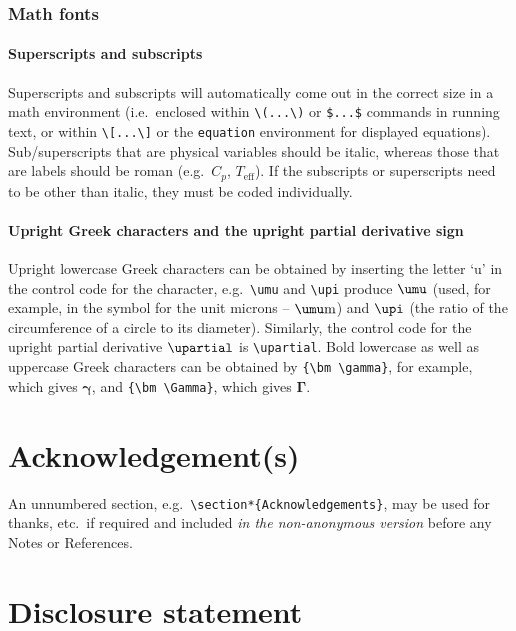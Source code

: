 \documentclass[]{interact}
\theoremstyle{plain}%
\theoremstyle{definition}
\theoremstyle{remark}
\begin{document}
\subsubsection{Math fonts}

\paragraph{Superscripts and subscripts}
Superscripts and subscripts will automatically come out in the correct size in a math environment (i.e.\ enclosed within \verb"\(...\)" or \verb"$...$" commands in running text, or within \verb"\[...\]" or the \texttt{equation} environment for displayed equations). Sub/superscripts that are physical variables should be italic, whereas those that are labels should be roman (e.g.\ $C_p$, $T_\mathrm{eff}$). If the subscripts or superscripts need to be other than italic, they must be coded individually.

\paragraph{Upright Greek characters and the upright partial derivative sign}
Upright lowercase Greek characters can be obtained by inserting the letter `u' in the control code for the character, e.g.\ \verb"\umu" and \verb"\upi" produce $\umu$ (used, for example, in the symbol for the unit microns -- $\umu\mathrm{m}$) and $\upi$ (the ratio of the circumference of a circle to its diameter). Similarly, the control code for the upright partial derivative $\upartial$ is \verb"\upartial". Bold lowercase as well as uppercase Greek characters can be obtained by \verb"{\bm \gamma}", for example, which gives ${\bm \gamma}$, and \verb"{\bm \Gamma}", which gives ${\bm \Gamma}$.


\section*{Acknowledgement(s)}

An unnumbered section, e.g.\ \verb"\section*{Acknowledgements}", may be used for thanks, etc.\ if required and included \emph{in the non-anonymous version} before any Notes or References.


\section*{Disclosure statement}
\end{document}

